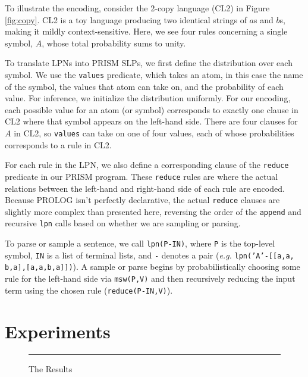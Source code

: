 \documentclass[11pt, twocolumn]{article}
\begin{document}
To illustrate the encoding, consider the 2-copy language (CL2) in Figure \ref{fig:copy}. CL2 is a toy language producing two identical strings of $a$s and $b$s, making it mildly context-sensitive. Here, we see four rules concerning a single symbol, $A$, whose total probability sums to unity.

To translate LPNs into PRISM SLPs, we first define the distribution over each symbol. We use the {\tt values} predicate, which takes an atom, in this case the name of the symbol, the values that atom can take on, and the probability of each value. For inference, we initialize the distribution uniformly. For our encoding, each possible value for an atom (or symbol) corresponds to exactly one clause in CL2 where that symbol appears on the left-hand side. There are four clauses for $A$ in CL2, so {\tt values} can take on one of four values, each of whose probabilities corresponds to a rule in CL2.

For each rule in the LPN, we also define a corresponding clause of the {\tt reduce} predicate in our PRISM program. These {\tt reduce} rules are where the actual relations between the left-hand and right-hand side of each rule are encoded. Because PROLOG isn't perfectly declarative, the actual {\tt reduce} clauses are slightly more complex than presented here, reversing the order of the {\tt append} and recursive {\tt lpn} calls based on whether we are sampling or parsing.

To parse or sample a sentence, we call {\tt lpn(P-IN)}, where {\tt P} is the top-level symbol, {\tt IN} is a list of terminal lists, and {\tt -} denotes a pair ({\it e.g.} {\tt lpn('A'-[[a,a,
b,a],[a,a,b,a]])}). A sample or parse begins by probabilistically choosing some rule for the left-hand side via {\tt msw(P,V)} and then recursively reducing the input term using the chosen rule ({\tt reduce(P-IN,V)}). 
\section{Experiments}

\begin{figure}
	\rule{\linewidth}{3in}
	\caption{The Results}
	\label{fig:results}
\end{figure}
\end{document}
